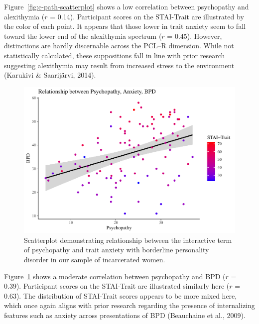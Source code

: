 \documentclass[
  man,floatsintext]{apa7}
\begin{document}
Figure~\ref{fig:c-path-scatterplot} shows a low correlation between psychopathy and alexithymia (\(r\) = 0.14). Participant scores on the STAI-Trait are illustrated by the color of each point. It appears that those lower in trait anxiety seem to fall toward the lower end of the alexithymia spectrum (\(r\) = 0.45). However, distinctions are hardly discernable across the PCL--R dimension. While not statistically calculated, these suppositions fall in line with prior research suggesting alexithymia may result from increased stress to the environment (Karukivi \& Saarijärvi, 2014).



\begin{figure}
\includegraphics[width=1\linewidth]{d2m-Psychopathy_files/figure-latex/a-path-scatterplot-1} \caption{Scatterplot demonstrating relationship between the interactive term of psychopathy and trait anxiety with borderline personality disorder in our sample of incarcerated women.}\label{fig:a-path-scatterplot}
\end{figure}

Figure~\ref{fig:a-path-scatterplot} shows a moderate correlation between psychopathy and BPD (\(r\) = 0.39). Participant scores on the STAI-Trait are illustrated similarly here (\(r\) = 0.63). The distribution of STAI-Trait scores appears to be more mixed here, which once again aligns with prior research regarding the presence of internalizing features such as anxiety across presentations of BPD (Beauchaine et al., 2009).
\end{document}

